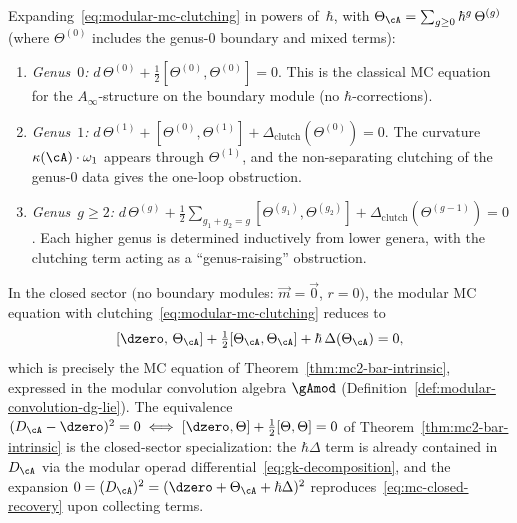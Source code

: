 \begin{remark}
\label{rem:genus-expansion-mc}
Expanding~\eqref{eq:modular-mc-clutching} in powers
of~$\hbar$, with $\Theta_\cA = \sum_{g \geq 0}
\hbar^g\, \Theta^{(g)}$ (where $\Theta^{(0)}$ includes the
genus-$0$ boundary and mixed terms):
\begin{enumerate}[label=\textup{(\arabic*)}]
\item \emph{Genus~$0$:}
  $d\,\Theta^{(0)} + \tfrac{1}{2}[\Theta^{(0)}, \Theta^{(0)}]
  = 0$.
  This is the classical MC equation for the $A_\infty$-structure
  on the boundary module (no $\hbar$-corrections).
\item \emph{Genus~$1$:}
  $d\,\Theta^{(1)} + [\Theta^{(0)}, \Theta^{(1)}]
  + \Delta_{\mathrm{clutch}}(\Theta^{(0)}) = 0$.
  The curvature $\kappa(\cA) \cdot \omega_1$ appears through
  $\Theta^{(1)}$, and the non-separating clutching of the
  genus-$0$ data gives the one-loop obstruction.
\item \emph{Genus~$g \geq 2$:}
  $d\,\Theta^{(g)} + \frac{1}{2}\sum_{g_1 + g_2 = g}
  [\Theta^{(g_1)}, \Theta^{(g_2)}]
  + \Delta_{\mathrm{clutch}}(\Theta^{(g-1)}) = 0$.
  Each higher genus is determined inductively from lower genera,
  with the clutching term acting as a ``genus-raising''
  obstruction.
\end{enumerate}
\end{remark}

\begin{corollary}
\label{cor:recovery-bar-intrinsic}
In the closed sector $($no boundary modules:
$\vec{m} = \vec{0}$, $r = 0)$, the modular MC equation with
clutching~\eqref{eq:modular-mc-clutching} reduces to
\begin{equation}\label{eq:mc-closed-recovery}
[\dzero,\, \Theta_\cA]
+ \tfrac{1}{2}[\Theta_\cA, \Theta_\cA]
+ \hbar\,\Delta(\Theta_\cA) = 0,
\end{equation}
which is precisely the MC equation of
Theorem~\textup{\ref{thm:mc2-bar-intrinsic}}, expressed in the
modular convolution algebra
$\gAmod$
\textup{(}Definition~\textup{\ref{def:modular-convolution-dg-lie})}.
The equivalence $(D_\cA - \dzero)^2 = 0 \iff
[\dzero, \Theta] + \frac{1}{2}[\Theta, \Theta] = 0$ of
Theorem~\textup{\ref{thm:mc2-bar-intrinsic}} is the closed-sector
specialization: the $\hbar\Delta$ term is already contained in
$D_\cA$ via the modular operad differential~\eqref{eq:gk-decomposition},
and the expansion
$0 = (D_\cA)^2 = (\dzero + \Theta_\cA + \hbar\Delta)^2$
reproduces~\eqref{eq:mc-closed-recovery} upon collecting terms.
\end{corollary}


